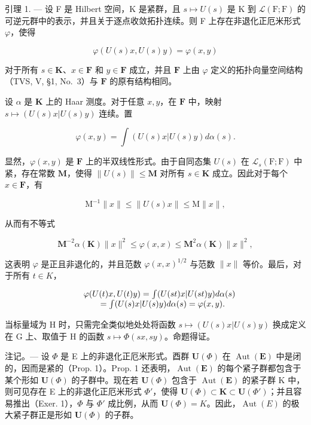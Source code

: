 引理 1. --- 设 F 是 Hilbert 空间，K 是紧群，且 \(s \mapsto U(s)\) 是 K 到 \(\mathcal{L}(\mathrm{F};\mathrm{F})\) 的可逆元群中的表示，并且关于逐点收敛拓扑连续。则 F 上存在非退化正厄米形式 \(\varphi\)，使得

\[
\varphi (U (s) x, U (s) y) = \varphi (x, y)
\]

对于所有 \(s \in \mathbf{K}\)、\(x \in \mathbf{F}\) 和 \(y \in \mathbf{F}\) 成立，并且 \(\mathbf{F}\) 上由 \(\varphi\) 定义的拓扑向量空间结构（TVS, V, §1, No.~3）与 \(\mathbf{F}\) 的原有结构相同。

设 \(\alpha\) 是 \(\mathbf{K}\) 上的 Haar 测度。对于任意 \(x, y\)，在 \(\mathbf{F}\) 中，映射 \(s \mapsto (U(s)x|U(s)y)\) 连续。置

\[
\varphi (x, y) = \int (U (s) x | U (s) y) d \alpha (s).
\]

显然，\(\varphi(x,y)\) 是 \(\mathbf{F}\) 上的半双线性形式。由于自同态集 \(U(s)\) 在 \(\mathcal{L}_s(\mathrm{F};\mathrm{F})\) 中紧，存在常数 \(\mathbf{M}\)，使得 \(\| U(s)\| \leqslant \mathbf{M}\) 对所有 \(s\in \mathbf{K}\) 成立。因此对于每个 \(x\in \mathbf{F}\)，有

\[
\mathrm{M} ^ {- 1} \| x \| \leqslant \| U (s) x \| \leqslant \mathrm{M} \| x \|,
\]

从而有不等式

\[
\mathbf {M} ^ {- 2} \alpha (\mathbf {K}) \| x \| ^ {2} \leqslant \varphi (x, x) \leqslant \mathbf {M} ^ {2} \alpha (\mathbf {K}) \| x \| ^ {2},
\]

这表明 \(\varphi\) 是正且非退化的，并且范数 \(\varphi(x,x)^{1/2}\) 与范数 \(\|x\|\) 等价。最后，对于所有 \(t \in K\)，

\[
\begin{array}{r l} & {\varphi (U (t) x, U (t) y) = \int (U (s t) x | U (s t) y) d \alpha (s)} \\ & {\qquad = \int (U (s) x | U (s) y) d \alpha (s) = \varphi (x, y).} \end{array}
\]

当标量域为 H 时，只需完全类似地处处将函数 \(s \mapsto (U(s)x|U(s)y)\) 换成定义在 G 上、取值于 H 的函数 \(s \mapsto \Phi(sx, sy)\)。命题得证。

注记。--- 设 \(\Phi\) 是 E 上的非退化正厄米形式。酉群 \(\mathbf{U}(\Phi)\) 在 \(\operatorname{Aut}(\mathbf{E})\) 中是闭的，因而是紧的（Prop. 1）。Prop. 1 还表明，\(\operatorname{Aut}(\mathbf{E})\) 的每个紧子群都包含于某个形如 \(\mathbf{U}(\Phi)\) 的子群中。现在若 \(\mathbf{U}(\Phi)\) 包含于 \(\operatorname{Aut}(\mathbf{E})\) 的紧子群 K 中，则可见存在 E 上的非退化正厄米形式 \(\Phi'\)，使得 \(\mathbf{U}(\Phi) \subset \mathbf{K} \subset \mathbf{U}(\Phi')\)；并且容易推出（Exer. 1），\(\Phi\) 与 \(\Phi'\) 成比例，从而 \(\mathbf{U}(\Phi) = K\)。因此，\(\operatorname{Aut}(E)\) 的极大紧子群正是形如 \(\mathbf{U}(\Phi)\) 的子群。

